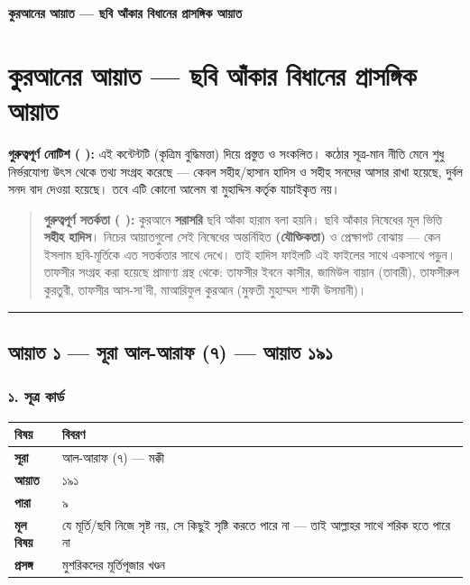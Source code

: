 

\begin{center}{\Large\bfseries\color{emerald} কুরআনের আয়াত — ছবি আঁকার বিধানের প্রাসঙ্গিক আয়াত}\end{center}
\vspace{1em}
\section*{কুরআনের আয়াত — ছবি আঁকার বিধানের প্রাসঙ্গিক আয়াত}

\begin{warnbox}
 \textbf{গুরুত্বপূর্ণ নোটিশ ( ):} এই কন্টেন্টটি  (কৃত্রিম বুদ্ধিমত্তা) দিয়ে প্রস্তুত ও সংকলিত।  কঠোর সূত্র-মান নীতি মেনে শুধু নির্ভরযোগ্য উৎস থেকে তথ্য সংগ্রহ করেছে — কেবল সহীহ/হাসান হাদিস ও সহীহ সনদের আসার রাখা হয়েছে, দুর্বল সনদ বাদ দেওয়া হয়েছে। তবে এটি কোনো আলেম বা মুহাদ্দিস কর্তৃক যাচাইকৃত নয়।
\end{warnbox}

\begin{quote}
\textbf{গুরুত্বপূর্ণ সতর্কতা ( ):} কুরআনে \textbf{সরাসরি} ছবি আঁকা হারাম বলা হয়নি। ছবি আঁকার নিষেধের মূল ভিত্তি \textbf{সহীহ হাদিস}। নিচের আয়াতগুলো সেই নিষেধের অন্তর্নিহিত \textbf{ (যৌক্তিকতা)} ও প্রেক্ষাপট বোঝায় — কেন ইসলাম ছবি-মূর্তিকে এত সতর্কতার সাথে দেখে। তাই হাদিস ফাইলটি এই ফাইলের সাথে একসাথে পড়ুন। \\
তাফসীর সংগ্রহ করা হয়েছে প্রামাণ্য গ্রন্থ থেকে: তাফসীর ইবনে কাসীর, জামিউল বায়ান (তাবারী), তাফসীরুল কুরতুবী, তাফসীর আস-সা'দী, মাআরিফুল কুরআন (মুফতী মুহাম্মদ শাফী উসমানী)।
\end{quote}

\medskip\hrule\medskip

\subsection*{আয়াত ১ — সূরা আল-আরাফ (৭) — আয়াত ১৯১}

\subsubsection*{১. সূত্র কার্ড}

\begin{table}[h]\centering\small
\begin{tabular}{ll}
বিষয় & বিবরণ \\
\hline
\textbf{সূরা} & আল-আরাফ (৭) — মক্কী \\
\textbf{আয়াত} & ১৯১ \\
\textbf{পারা} & ৯ \\
\textbf{মূল বিষয়} & যে মূর্তি/ছবি নিজে সৃষ্ট নয়, সে কিছুই সৃষ্টি করতে পারে না — তাই আল্লাহর সাথে শরিক হতে পারে না \\
\textbf{প্রসঙ্গ} & মুশরিকদের মূর্তিপূজার খণ্ডন \\
\hline
\end{tabular}
\end{table}

